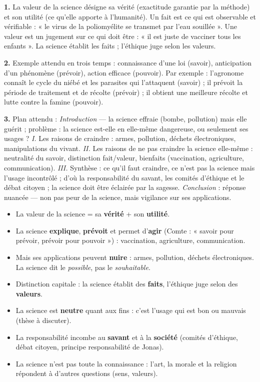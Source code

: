 \documentclass[11pt]{article}
\begin{document}
\begin{corrige}[Exercice]
\textbf{1.} La valeur de la science désigne sa vérité (exactitude garantie par la méthode) et son utilité (ce qu'elle apporte à l'humanité). Un fait est ce qui est observable et vérifiable : « le virus de la poliomyélite se transmet par l'eau souillée ». Une valeur est un jugement sur ce qui doit être : « il est juste de vacciner tous les enfants ». La science établit les faits ; l'éthique juge selon les valeurs.

\textbf{2.} Exemple attendu en trois temps : connaissance d'une loi (savoir), anticipation d'un phénomène (prévoir), action efficace (pouvoir). Par exemple : l'agronome connaît le cycle du niébé et les parasites qui l'attaquent (savoir) ; il prévoit la période de traitement et de récolte (prévoir) ; il obtient une meilleure récolte et lutte contre la famine (pouvoir).

\textbf{3.} Plan attendu : \emph{Introduction} — la science effraie (bombe, pollution) mais elle guérit ; problème : la science est-elle en elle-même dangereuse, ou seulement ses usages ? \emph{I.} Les raisons de craindre : armes, pollution, déchets électroniques, manipulations du vivant. \emph{II.} Les raisons de ne pas craindre la science elle-même : neutralité du savoir, distinction fait/valeur, bienfaits (vaccination, agriculture, communication). \emph{III.} Synthèse : ce qu'il faut craindre, ce n'est pas la science mais l'usage incontrôlé ; d'où la responsabilité du savant, les comités d'éthique et le débat citoyen ; la science doit être éclairée par la sagesse. \emph{Conclusion} : réponse nuancée — non pas peur de la science, mais vigilance sur ses applications.
\end{corrige}

\begin{aretenir}
\begin{itemize}
\item La valeur de la science = sa \textbf{vérité} + son \textbf{utilité}.
\item La science \textbf{explique}, \textbf{prévoit} et permet d'\textbf{agir} (Comte : « savoir pour prévoir, prévoir pour pouvoir ») : vaccination, agriculture, communication.
\item Mais ses applications peuvent \textbf{nuire} : armes, pollution, déchets électroniques. La science dit le \emph{possible}, pas le \emph{souhaitable}.
\item Distinction capitale : la science établit des \textbf{faits}, l'éthique juge selon des \textbf{valeurs}.
\item La science est \textbf{neutre} quant aux fins : c'est l'usage qui est bon ou mauvais (thèse à discuter).
\item La responsabilité incombe au \textbf{savant} et à la \textbf{société} (comités d'éthique, débat citoyen, principe responsabilité de Jonas).
\item La science n'est pas toute la connaissance : l'art, la morale et la religion répondent à d'autres questions (sens, valeurs).
\end{itemize}
\end{aretenir}
\end{document}

